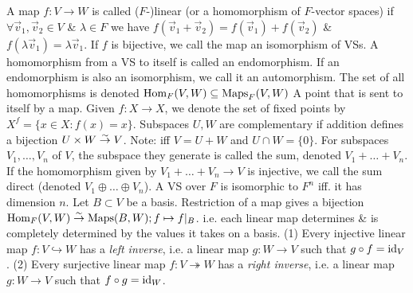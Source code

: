  A map $f : V \to W$ is called ($F$-)linear (or a homomorphism of $F$-vector spaces) if $\forall \vec{v}_{1}, \vec{v}_{2} \in V$ \& $\lambda \in F$ we have $f(\vec{v}_{1} + \vec{v}_{2}) = f(\vec{v}_{1}) + f(\vec{v}_{2})$ \& $f(\lambda \vec{v}_{1}) = \lambda \vec{v}_{1}$. If $f$ is bijective, we call the map an isomorphism of VSs. A homomorphism from a VS to itself is called an endomorphism. If an endomorphism is also an isomorphism, we call it an automorphism. The set of all homomorphisms is denoted $\text{Hom}_{F}(V,W) \subseteq \text{Maps}_{F}(V,W)$
 A point that is sent to itself by a map. Given $f : X \to X$, we denote the set of fixed points by $X^{f} = \{x \in X : f(x) = x\}$.
 Subspaces $U,W$ are complementary if addition defines a bijection $U \times W \stackrel{\sim}{\to} V$.
Note: iff $V = U + W$ and $U \cap W = \{0\}$.
 For subspaces $V_{1}, \dots, V_{n}$ of $V$, the subspace they generate is called the sum, denoted $V_{1} + \dots + V_{n}$. If the homomorphism given by $V_{1} + \dots + V_{n} \to V$ is injective, we call the sum direct (denoted $V_{1} \oplus \dots \oplus V_{n}$).
 A VS over $F$ is isomorphic to $F^{n}$ iff. it has dimension $n$.
 Let $B \subset V$ be a basis. Restriction of a map gives a bijection $\text{Hom}_{F}(V, W) \stackrel{\sim}{\to} \text{Maps}(B, W); f \mapsto f |_{B}$. i.e. each linear map determines \& is completely determined by the values it takes on a basis.
(1) Every injective linear map $f : V \hookrightarrow W$ has a \emph{left inverse}, i.e. a linear map $g : W \to V$ such that $g \circ f = \text{id}_{V}$.
(2) Every surjective linear map $f : V \twoheadrightarrow W$ has a \emph{right inverse}, i.e. a linear map $g : W \to V$ such that $f \circ g = \text{id}_{W}$.
